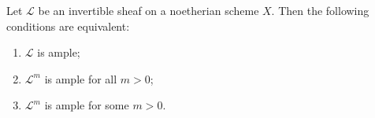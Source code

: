 Let $\mathcal{L}$ be an invertible sheaf on a noetherian scheme $X$. Then the following conditions are equivalent:
\begin{enumerate}
\item[(i)] $\mathcal{L}$ is ample;
\item[(ii)] $\mathcal{L}^m$ is ample for all $m > 0$;
\item[(iii)] $\mathcal{L}^m$ is ample for some $m > 0$.
\end{enumerate}
